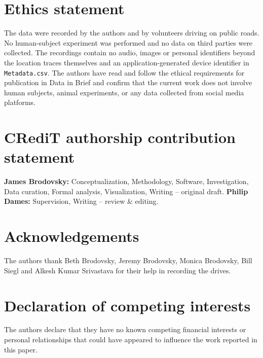 \section*{Ethics statement}

The data were recorded by the authors and by volunteers driving on public roads. No human-subject experiment was performed and no data on third parties were collected. The recordings contain no audio, images or personal identifiers beyond the location traces themselves and an application-generated device identifier in \texttt{Metadata.csv}.  The authors have read and follow the ethical requirements for publication in Data in Brief and confirm that the current work does not involve human subjects, animal experiments, or any data collected from social media platforms.

\section*{CRediT authorship contribution statement}

\textbf{James Brodovsky:} Conceptualization, Methodology, Software, Investigation, Data curation, Formal analysis, Visualization, Writing -- original draft. \textbf{Philip Dames:} Supervision, Writing -- review \& editing. 

\section*{Acknowledgements}

The authors thank Beth Brodovsky, Jeremy Brodovsky, Monica Brodovsky, Bill Siegl and Alkesh Kumar Srivastava for their help in recording the drives. 

\section*{Declaration of competing interests}

The authors declare that they have no known competing financial interests or personal relationships that could have appeared to influence the work reported in this paper. 
